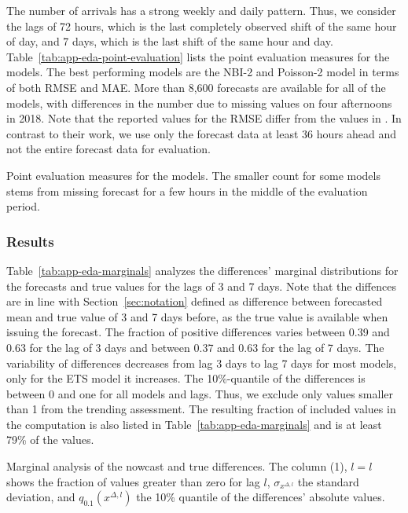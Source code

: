The number of arrivals has a strong weekly and daily pattern.
Thus, we consider the lags of 72 hours, which is the last completely observed shift of the same hour of day, and 7 days, which is the last shift of the same hour and day.
Table~\ref{tab:app-eda-point-evaluation} lists the point evaluation measures for the models.
The best performing models are the NBI-2 and Poisson-2 model in terms of both RMSE and MAE.
More than 8,600 forecasts are available for all of the models, with differences in the number due to missing values on four afternoons in 2018.
Note that the reported values for the RMSE differ from the values in \textcite{Rostami-Tabar2023}.
In contrast to their work, we use only the forecast data at least 36 hours ahead and not the entire forecast data for evaluation.

\begin{table}
\centering

\caption{Point evaluation measures for the models. The smaller count for some models stems from missing forecast for a few hours in the middle of the evaluation period.}\label{tab:app-eda-point-evaluation}
\end{table}


\subsubsection*{Results}

Table~\ref{tab:app-eda-marginals} analyzes the differences' marginal distributions for the forecasts and true values for the lags of 3 and 7 days.
Note that the diffences are in line with Section~\ref{sec:notation} defined as difference between forecasted mean and true value of 3 and 7 days before, as the true value is available when issuing the forecast.
The fraction of positive differences varies between 0.39 and 0.63 for the lag of 3 days and between 0.37 and 0.63 for the lag of 7 days.
The variability of differences decreases from lag 3 days to lag 7 days for most models, only for the ETS model it increases.
The 10\%-quantile of the differences is between 0 and one for all models and lags.
Thus, we exclude only values smaller than 1 from the trending assessment.
The resulting fraction of included values in the computation is also listed in Table~\ref{tab:app-eda-marginals} and is at least 79\% of the values.

\begin{table}
    \centering
    
    \caption{Marginal analysis of the nowcast and true differences. The column (1), $l=l$ shows the fraction of values greater than zero for lag $l$, $\sigma_{x^{\Delta, l}}$ the standard deviation, and $q_{0.1} (x^{\Delta, l})$ the 10\% quantile of the differences' absolute values.}
    \label{tab:app-eda-marginals}
\end{table}

